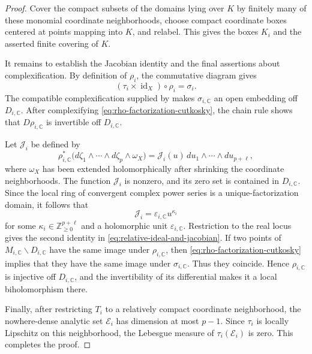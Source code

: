 \documentclass[reqno,11pt]{amsart}
\numberwithin{equation}{section}
\theoremstyle{definition}
\theoremstyle{remark}
\begin{document}
\begin{proof}
Cover the compact subsets of the domains lying over $K$ by finitely many of
these monomial coordinate neighborhoods, choose compact coordinate boxes
centered at points mapping into $K$, and relabel. This gives the boxes
$K_i$ and the asserted finite covering of $K$.

It remains to establish the Jacobian identity and the final assertions
about complexification. By definition of $\rho_i$, the commutative diagram
gives
\begin{equation}\label{eq:rho-factorization-cutkosky}
(\tau_i\times\operatorname{id}_X)\circ\rho_i=\sigma_i.
\end{equation}
The compatible complexification supplied by
\cite[Proposition~9.6]{Cutkosky2017} makes
$\sigma_{i,\mathbb C}$ an open embedding off $D_{i,\mathbb C}$. After
complexifying \eqref{eq:rho-factorization-cutkosky}, the chain rule shows
that $D\rho_{i,\mathbb C}$ is invertible off $D_{i,\mathbb C}$.

Let $\mathcal J_i$ be defined by
$$
\rho_{i,\mathbb C}^*
\bigl(
d\zeta_1\wedge\cdots\wedge d\zeta_p\wedge\omega_X
\bigr)
=
\mathcal J_i(u)\,
du_1\wedge\cdots\wedge du_{p+\ell},
$$
where $\omega_X$ has been extended holomorphically after shrinking the
coordinate neighborhoods. The function $\mathcal J_i$ is nonzero, and its
zero set is contained in $D_{i,\mathbb C}$. Since the local ring of
convergent complex power series is a unique-factorization domain, it follows
that
$$
\mathcal J_i=\varepsilon_{i,\mathbb C}u^{\kappa_i}
$$
for some $\kappa_i\in\mathbb Z_{\ge0}^{p+\ell}$ and a holomorphic unit
$\varepsilon_{i,\mathbb C}$. Restriction to the real locus gives the second
identity in \eqref{eq:relative-ideal-and-jacobian}. If two points of
$M_{i,\mathbb C}\smallsetminus D_{i,\mathbb C}$ have the same image under
$\rho_{i,\mathbb C}$, then
\eqref{eq:rho-factorization-cutkosky} implies that they have the same image
under $\sigma_{i,\mathbb C}$. Thus they coincide. Hence
$\rho_{i,\mathbb C}$ is injective off $D_{i,\mathbb C}$, and the
invertibility of its differential makes it a local biholomorphism there.

Finally, after restricting $T_i$ to a relatively compact coordinate
neighborhood, the nowhere-dense analytic set $\mathcal E_i$ has dimension
at most $p-1$. Since $\tau_i$ is locally Lipschitz on this neighborhood, the Lebesgue measure of
$\tau_i(\mathcal E_i)$ is zero. This completes the proof.
\end{proof}
\end{document}

